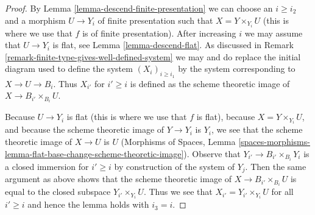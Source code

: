 \documentclass{stacks-project}
\theoremstyle{plain}
\theoremstyle{definition}
\theoremstyle{remark}
\numberwithin{equation}{subsection}
\begin{document}
\begin{proof}
By Lemma \ref{lemma-descend-finite-presentation}
we can choose an $i \geq i_2$ and a morphism
$U \to Y_i$ of finite presentation such that $X = Y \times_{Y_i} U$
(this is where we use that $f$ is of finite presentation).
After increasing $i$ we may assume that $U \to Y_i$ is flat, see
Lemma \ref{lemma-descend-flat}.
As discussed in Remark \ref{remark-finite-type-gives-well-defined-system}
we may and do replace the initial diagram used to define the system
$(X_i)_{i \geq i_1}$ by the system corresponding to
$X \to U \to B_i$. Thus $X_{i'}$ for $i' \geq i$ is defined as
the scheme theoretic image of $X \to B_{i'} \times_{B_i} U$.

\medskip\noindent
Because $U \to Y_i$ is flat (this is where we use that $f$ is flat),
because $X = Y \times_{Y_i} U$, and
because the scheme theoretic image of $Y \to Y_i$ is $Y_i$,
we see that the scheme theoretic image of $X \to U$ is $U$
(Morphisms of Spaces, Lemma
\ref{spaces-morphisms-lemma-flat-base-change-scheme-theoretic-image}).
Observe that $Y_{i'} \to B_{i'} \times_{B_i} Y_i$ is a closed
immersion for $i' \geq i$ by construction of the system of $Y_j$.
Then the same argument as above shows that the scheme theoretic image
of $X \to B_{i'} \times_{B_i} U$
is equal to the closed subspace $Y_{i'} \times_{Y_i} U$.
Thus we see that $X_{i'} = Y_{i'} \times_{Y_i} U$ for all $i' \geq i$
and hence the lemma holds with $i_3 = i$.
\end{proof}
\end{document}
